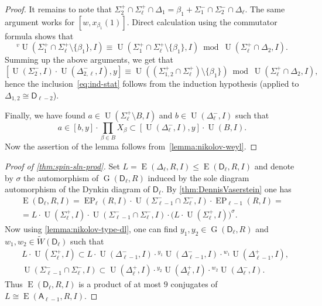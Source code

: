 \documentclass[oneside, 12pt]{amsart}
\theoremstyle{plain}
\numberwithin{equation}{section}
\numberwithin{lemma}{section}
\theoremstyle{definition}
\theoremstyle{remark}
\DeclareMathOperator{\G}{G}
\DeclareMathOperator{\E}{E}
\DeclareMathOperator{\EP}{EP}
\DeclareMathOperator{\U}{U}
\newcommand{\rA}{\mathsf{A}}
\newcommand{\rD}{\mathsf{D}}
\begin{document}
\begin{proof}
It remains to note that $\Sigma_2^+ \cap \Sigma_\ell^+ \cap \Delta_1 = \beta_1 + \Sigma_1^- \cap \Sigma_2^- \cap \Delta_\ell$. The same argument works for $[w, x_{\beta_1}(1)]$.
Direct calculation using the commutator formula shows that
\[ {}^v\!\U(\Sigma_1^+\cap\Sigma_\ell^+\setminus\{\beta_1\}, I) \equiv \U(\Sigma_1^+\cap\Sigma_\ell^+\setminus\{\beta_1\}, I) \bmod \U(\Sigma_\ell^+\cap\Delta_2, I). \]
Summing up the above arguments, we get that
\[ [\U(\Sigma_2^-, I)\cdot\U(\Delta_{2, \ell}^-, I), y] \equiv \U((\Sigma_{1, 2}^+\cap\Sigma_\ell^+)\setminus\{\beta_1\}) \bmod \U(\Sigma_\ell^+\cap\Delta_2, I), \]
hence the inclusion~\eqref{eq:ind-stat} follows from the induction hypothesis (applied to $\Delta_{1, 2} \cong \rD_{\ell-2}$). 

Finally, we have found $a\in\U(\Sigma_\ell^+\setminus B, I)$ and $b\in\U(\Delta_\ell^-, I)$
such that $$a\in[b, y]\cdot\prod_{\beta\in B}X_\beta\subset[\U(\Delta_\ell^-, I), y]\cdot\U(B, I).$$
Now the assertion of the lemma follows from~\cref{lemma:nikolov-weyl}.
\end{proof}

\begin{proof}[Proof of \cref{thm:spin-sln-prod}]
Set $L = \E(\Delta_\ell, R, I) \leq \E(\rD_\ell, R, I)$ and denote by $\sigma$ the automorphism of $\G(\rD_\ell, R)$ induced by the sole diagram automorphism of the Dynkin diagram of $\rD_\ell$.
By \cref{thm:DennisVaserstein} one has
\begin{multline*}
\E(\rD_\ell, R, I) = \EP_{\ell}(R, I)\cdot\U(\Sigma_{\ell-1}^- \cap \Sigma_{\ell}^-, I)\cdot\EP_{\ell-1}(R, I) = \\
= L \cdot\U(\Sigma_\ell^+, I)\cdot\U(\Sigma_{\ell-1}^- \cap \Sigma_{\ell}^-, I)\cdot \big(L \cdot \U(\Sigma_\ell^+, I) \big)^\sigma.
\end{multline*}  
Now using \cref{lemma:nikolov-type-dl}, one can find $y_1, y_2\in\G(\rD_\ell, R)$ and $w_1, w_2\in\widetilde{W}(\rD_\ell)$ such that
\begin{align*} & L \cdot \U(\Sigma_\ell^+, I) \subset L \cdot \U(\Delta_{\ell-1}^-, I) \cdot {}^{y_1}\!\U(\Delta_{\ell-1}^-, I) \cdot {}^{w_1}\!\U(\Delta_{\ell-1}^+, I), \\
& \U(\Sigma_{\ell-1}^-\cap\Sigma_\ell^-, I) \subset \U(\Delta_\ell^+, I) \cdot {}^{y_2}\!\U(\Delta_\ell^+, I) \cdot {}^{w_2}\!\U(\Delta_\ell^-, I). \end{align*} 
Thus $\E(\rD_\ell, R, I)$ is a product of at most $9$ conjugates of $L \cong \E(\rA_{\ell-1}, R, I)$. \end{proof}

\printbibliography
\end{document}
